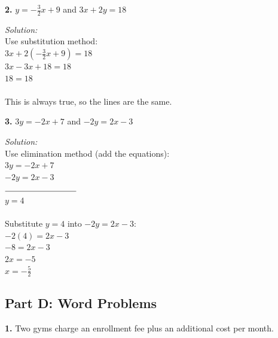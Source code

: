 \documentclass[12pt]{article}
\begin{document}

                \vspace{0.5cm}

            \textbf{2.} $y = -\frac{3}{2}x + 9$ and $3x + 2y = 18$

                \textit{Solution:}\\
                Use substitution method:\\
                $3x + 2\left(-\frac{3}{2}x + 9\right) = 18$\\
                $3x - 3x + 18 = 18$\\
                $18 = 18$\\
                \\
                This is always true, so the lines are the same.


                \vspace{0.5cm}

            \textbf{3.} $3y = -2x + 7$ and $-2y = 2x - 3$

                \textit{Solution:}\\
                Use elimination method (add the equations):\\
                $3y = -2x + 7$\\
                $-2y = 2x - 3$\\
                $\rule{3cm}{0.4pt}$\\
                $y = 4$\\
                \\
                Substitute $y = 4$ into $-2y = 2x - 3$:\\
                $-2(4) = 2x - 3$\\
                $-8 = 2x - 3$\\
                $2x = -5$\\
                $x = -\frac{5}{2}$


                \newpage

        \subsection*{Part D: Word Problems}

            \textbf{1.} Two gyms charge an enrollment fee plus an additional cost per month.
\end{document}
